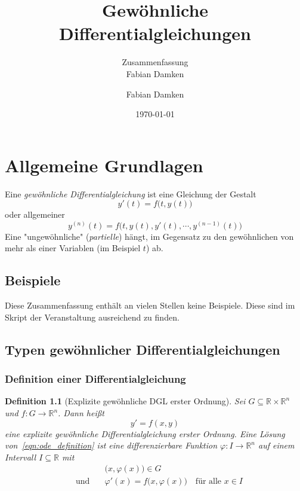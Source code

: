 \documentclass[a4paper, 11pt, accentcolor = tud3b]{tudreport}
\title{Gewöhnliche Differentialgleichungen}
\subtitle{Zusammenfassung \\ Fabian Damken}
\author{Fabian Damken}
\date{\today}
\newtheorem{definition}[theorem]{Definition}
\newcommand{\R}{\mathbb{R}}
\begin{document}
	\maketitle
	\tableofcontents
	\listoftodos

	\chapter{Allgemeine Grundlagen}
		Eine \emph{gewöhnliche Differentialgleichung} ist eine Gleichung der Gestalt
		\begin{equation*}
			y'(t) = f\big(t, y(t)\big)
		\end{equation*}
		oder allgemeiner
		\begin{equation*}
			y^{(n)}(t) = f\big(t, y(t), y'(t), \cdots, y^{(n - 1)}(t)\big)
		\end{equation*}
		Eine "ungewöhnliche" (\emph{partielle}) hängt, im Gegensatz zu den gewöhnlichen von mehr als einer Variablen (im Beispiel \(t\)) ab.

		\section{Beispiele}
			Diese Zusammenfassung enthält an vielen Stellen keine Beispiele. Diese sind im Skript der Veranstaltung ausreichend zu finden.

		\section{Typen gewöhnlicher Differentialgleichungen}
			\subsection{Definition einer Differentialgleichung} %
				\begin{definition}[Explizite gewöhnliche DGL erster Ordnung]
					Sei \( G \subseteq \R \times \R^n \) und \( f : G \to \R^n \). Dann heißt
					\begin{equation}
						y' = f(x, y)  \label{eqn:ode_definition}
					\end{equation}
					eine \emph{explizite gewöhnliche Differentialgleichung erster Ordnung}. Eine \emph{Lösung} von~\ref{eqn:ode_definition} ist eine differenzierbare Funktion \( \varphi : I \to \R^n \) auf einem Intervall \( I \subseteq \R \) mit
					\begin{align*}
						                     & \big(x, \varphi(x)\big) \in G                                        \\
						\quad\text{und}\quad & \varphi'(x) = f\big(x, \varphi(x)\big) \quad\text{für alle } x \in I
					\end{align*}
				\end{definition}
			
\end{document}
